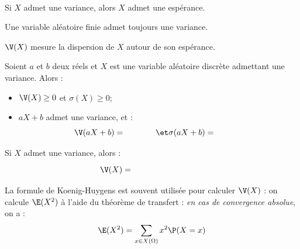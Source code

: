 \documentclass[a4paper,10pt]{report}
\begin{document}
\newpage

$\phantom{}$
\begin{preuve} 

\vspace{4cm}
\end{preuve}

\begin{rems} 
\item Si $X$ admet une variance, alors $X$ admet une espérance.
\item Une variable aléatoire finie admet toujours une variance.
\item $\V(X)$ mesure la dispersion de $X$ autour de son espérance.
\end{rems}

\begin{prop}
Soient $a$ et $b$ deux réels et $X$ est une variable aléatoire discrète admettant une variance. Alors :
\begin{itemize}
 \item $\V(X) \geq 0$ et $\sigma(X) \geq 0$;
 \item $aX+b$ admet une variance, et :  
$$\V(aX+b) = \phantom{a^2 \V(X)} \et \sigma(aX+b) = \phantom{\vert a \vert \sigma(X)} $$
\end{itemize}
\end{prop}

\begin{preuve}

\vspace{5cm}
\end{preuve}

\begin{prop}
Si $X$ admet une variance, alors :
$$\V(X) = \phantom{\E\big(X^2\big) - \big(\E(X)\big)^2}$$
\end{prop}

\begin{preuve}
\vspace{3cm}
\end{preuve}

\begin{metho} 
La formule de Koenig-Huygens est souvent utilisée pour calculer $\V(X)$ : on calcule $\E(X^2)$ à l'aide du {théorème de transfert} : \textit{en cas de convergence absolue}, on a : 
$$\E(X^2)=\sum\limits_{x\in X(\Omega)} x^2  \P(X=x)$$
\end{metho}
\end{document}
